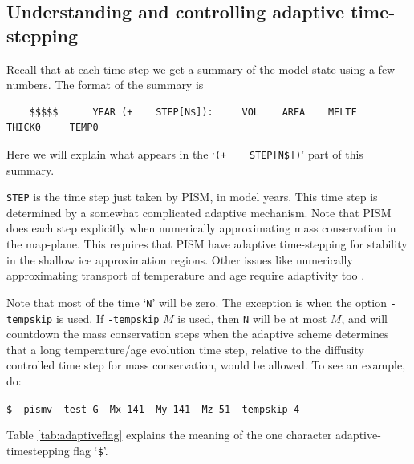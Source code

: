 \documentclass[11pt,final]{amsart}
\begin{document}
\subsection{Understanding and controlling adaptive time-stepping} \label{subsect:adapt} Recall that at each time step we get a summary of the model state using a few numbers.  The format of the summary is
\begin{verbatim}
    $$$$$      YEAR (+    STEP[N$]):     VOL    AREA    MELTF     THICK0     TEMP0
\end{verbatim}
Here we will explain what appears in the `\verb|(+    STEP[N$])|' part of this summary.

\verb|STEP| is the time step just taken by PISM, in model years.  This time step is determined by a somewhat complicated adaptive mechanism.  Note that PISM does each step explicitly when numerically approximating mass conservation in the map-plane.  This requires that PISM have adaptive time-stepping for stability in the shallow ice approximation regions.  Other issues like numerically approximating transport of temperature and age require adaptivity too \cite{BBL}.

Note that most of the time `\verb|N|' will be zero.  The exception is when the option \verb|-tempskip| is used.  If \verb|-tempskip| $M$ is used, then \verb|N| will be at most $M$, and will countdown the mass conservation steps when the adaptive scheme determines that a long temperature/age evolution time step, relative to the diffusity controlled time step for mass conservation, would be allowed.  To see an example, do: 

\verb|$  pismv -test G -Mx 141 -My 141 -Mz 51 -tempskip 4|

Table \ref{tab:adaptiveflag} explains the meaning of the one character adaptive-timestepping flag `\verb|$|'.
\end{document}
